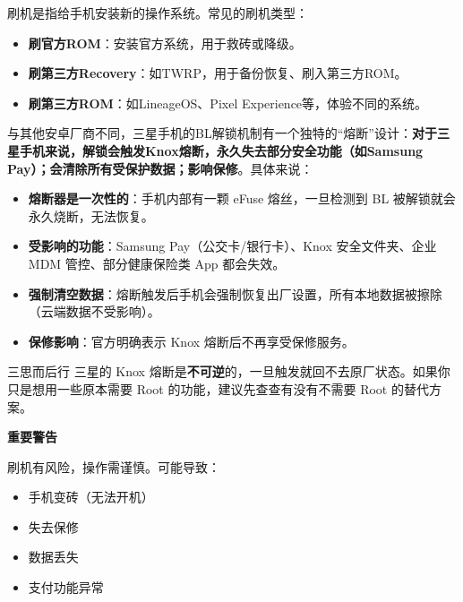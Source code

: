
刷机是指给手机安装新的操作系统。常见的刷机类型：

\begin{itemize}
  \item \textbf{刷官方ROM}：安装官方系统，用于救砖或降级。
  \item \textbf{刷第三方Recovery}：如TWRP，用于备份恢复、刷入第三方ROM。
  \item \textbf{刷第三方ROM}：如LineageOS、Pixel Experience等，体验不同的系统。
\end{itemize}


与其他安卓厂商不同，三星手机的BL解锁机制有一个独特的“熔断”设计：\textbf{对于三星手机来说，解锁会触发Knox熔断，永久失去部分安全功能（如Samsung Pay）；会清除所有受保护数据；影响保修}。具体来说：

\begin{itemize}
  \item \textbf{熔断器是一次性的}：手机内部有一颗 eFuse 熔丝，一旦检测到 BL 被解锁就会永久烧断，无法恢复。
  \item \textbf{受影响的功能}：Samsung Pay（公交卡/银行卡）、Knox 安全文件夹、企业 MDM 管控、部分健康保险类 App 都会失效。
  \item \textbf{强制清空数据}：熔断触发后手机会强制恢复出厂设置，所有本地数据被擦除（云端数据不受影响）。
  \item \textbf{保修影响}：官方明确表示 Knox 熔断后不再享受保修服务。
\end{itemize}

\begin{tcbwarn}{三思而后行}
三星的 Knox 熔断是\textbf{不可逆}的，一旦触发就回不去原厂状态。如果你只是想用一些原本需要 Root 的功能，建议先查查有没有不需要 Root 的替代方案。

\end{tcbwarn}

\textbf{重要警告}\par

刷机有风险，操作需谨慎。可能导致：

\begin{itemize}
  \item 手机变砖（无法开机）
  \item 失去保修
  \item 数据丢失
  \item 支付功能异常
\end{itemize}

